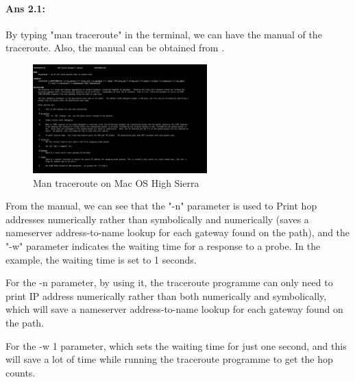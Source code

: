 \documentclass[paper=a4, fontsize=10pt]{scrartcl} %
\numberwithin{equation}{section} %
\numberwithin{figure}{section} %
\numberwithin{table}{section} %
\begin{document}
\paragraph{Ans 2.1:}By typing "man traceroute" in the terminal, we can have 
the manual of the traceroute.  Also, the manual can be obtained from \cite{traceroutemanual}.

\begin{figure}[htbp!]
		\centering
		\includegraphics[width=0.6\textwidth]{fig211.png}
		\caption{Man traceroute on Mac OS High Sierra}%
		\vspace{-1em}
\end{figure}

From the manual\cite{traceroutemanual}, we can see that the "-n" parameter is 
used to Print hop addresses numerically rather than symbolically and
numerically (saves a nameserver address-to-name lookup for each
gateway found on the path), and the "-w" parameter indicates the waiting time
for a response to a probe. In the example, the waiting time is set to 1 seconds.

For the -n parameter, by using it, the traceroute programme can only need to
print IP address numerically rather than both numerically and symbolically, which will save a nameserver address-to-name lookup for each
gateway found on the path\cite{traceroutemanual}.

For the -w 1 parameter, which sets the waiting time for just one second, and this will save a lot of time while running the traceroute programme to get the hop counts.
\end{document}
